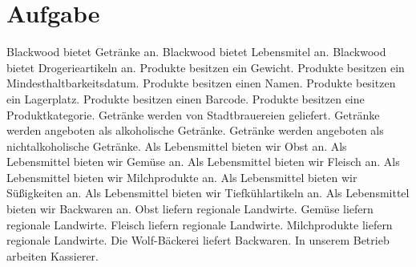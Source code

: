 \documentclass[a4paper,10pt]{scrartcl}
\begin{document}
\section{Aufgabe}
Blackwood bietet Getränke an.\newline
Blackwood bietet Lebensmitel an.\newline
Blackwood bietet Drogerieartikeln an.\newline
\newline
Produkte besitzen ein Gewicht.\newline
Produkte besitzen ein Mindesthaltbarkeitsdatum.\newline
Produkte besitzen einen Namen.\newline
Produkte besitzen ein Lagerplatz.\newline
Produkte besitzen einen Barcode.\newline
Produkte besitzen eine Produktkategorie.\newline
\newline
Getränke werden von Stadtbrauereien geliefert.\newline
Getränke werden angeboten als alkoholische Getränke.\newline
Getränke werden angeboten als nichtalkoholische Getränke.\newline
\newline
Als Lebensmittel bieten wir Obst an.\newline
Als Lebensmittel bieten wir Gemüse an.\newline
Als Lebensmittel bieten wir Fleisch an.\newline
Als Lebensmittel bieten wir Milchprodukte an.\newline
Als Lebensmittel bieten wir Süßigkeiten an.\newline
Als Lebensmittel bieten wir Tiefkühlartikeln an.\newline
Als Lebensmittel bieten wir Backwaren an.\newline
\newline
Obst liefern regionale Landwirte.\newline
Gemüse liefern regionale Landwirte.\newline
Fleisch liefern regionale Landwirte.\newline
Milchprodukte liefern regionale Landwirte.\newline
\newline
Die Wolf-Bäckerei liefert Backwaren.\newline
\newline
In unserem Betrieb arbeiten Kassierer.\newline
\end{document}
